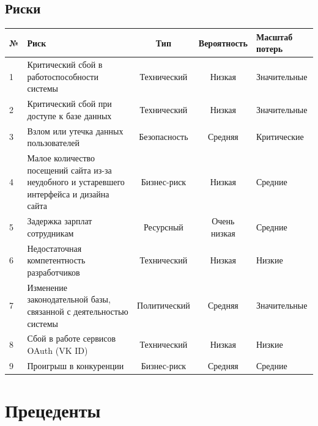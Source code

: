 \documentclass{scrreprt}
\begin{document}
\section{Риски}
\begin{table}[h]
	\centering
	\begin{tabular}{|l|p{5cm}|c|c|p{3cm}|}
		\hline
		№ & Риск & Тип & Вероятность & Масштаб потерь \\ \hline
		1 & Критический сбой в работоспособности системы & Технический & Низкая & Значительные \\ \hline
		2 & Критический сбой при доступе к базе данных & Технический & Низкая & Значительные \\ \hline
		3 & Взлом или утечка данных пользователей & Безопасность & Средняя & Критические \\ \hline
		4 & Малое количество посещений сайта из-за неудобного и устаревшего интерфейса и дизайна сайта & Бизнес-риск & Низкая & Средние \\ \hline
		5 & Задержка зарплат сотрудникам & Ресурсный & Очень низкая & Средние \\ \hline
		6 & Недостаточная компетентность разработчиков & Технический & Низкая & Низкие \\ \hline
		7 & Изменение законодательной базы, связанной с деятельностью системы & Политический & Средняя & Значительные \\ \hline
		8 & Сбой в работе сервисов OAuth (VK ID) & Технический & Низкая & Низкие \\ \hline
		9 & Проигрыш в конкуренции & Бизнес-риск & Средняя & Средние \\ \hline
	\end{tabular}
	\label{tab:requirements}
\end{table}
\chapter{Прецеденты}
\end{document}

